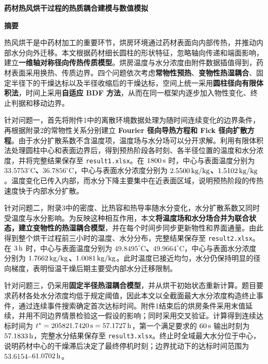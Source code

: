 \documentclass[UTF8,a4paper,12pt]{ctexart}
\begin{document}
\begin{center}
  {\fontsize{14pt}{18pt}\selectfont\bfseries 药材热风烘干过程的热质耦合建模与数值模拟}\par\vspace{10pt}
  {\fontsize{14pt}{18pt}\selectfont\bfseries 摘要}
\end{center}

热风烘干是中药材加工的重要环节，烘房环境通过药材表面向内部传热，并推动内部水分向外迁移。本文根据药材细长圆柱的形状特征，忽略轴向传递和端面影响，建立\textbf{一维轴对称径向传热传质模型}。烘房温度与水分浓度由附件数据插值得到，药材表面采用换热、传质边界。四个问题依次考虑\textbf{常物性预热}、\textbf{变物性热湿耦合}、固定半径下的干燥达标以及半径收缩后的干燥达标，空间上统一采用\textbf{圆柱径向有限体积法}，时间上采用\textbf{自适应 BDF 方法}，从而在同一框架内逐步加入物性变化、终止判据和移动边界。

针对问题一，首先将附件1中的离散环境数据处理为随时间连续变化的边界条件，再根据附录2的常物性关系分别建立\textbf{ Fourier 径向导热方程和 Fick 径向扩散方程}。由于水分扩散系数不含温度项，温度场与水分场可以分开求解。利用有限体积法处理圆柱中心和表面边界后，得到预热阶段各时刻、各半径位置的温度和水分浓度，并将完整结果保存至 \texttt{result1.xlsx}。在 $1800\rm\,s$ 时，中心与表面温度分别为 \textbf{\boldmath$33.5753^\circ\mathrm C$、$36.7856^\circ\mathrm C$}，中心与表面水分浓度分别为 \textbf{\boldmath$2.5500\rm\,kg/kg$、$1.5102\rm\,kg/kg$}。温度变化已传入内部，而水分下降主要集中在近表面区域，说明预热阶段的传热速度快于内部水分扩散。

针对问题二，附录3中的密度、比热容和热导率随水分变化，水分扩散系数又同时受温度与水分影响。为反映这种相互作用，本文\textbf{将温度场和水分场合并为联合状态，建立变物性的热湿耦合模型}，并在每个时间步同步更新物性和界面通量。由此得到整个烘干过程前三小时的温度、水分分布，完整结果保存至 \texttt{result2.xlsx}。在 $3\rm\,h$ 时，中心与表面温度分别为 \textbf{\boldmath$49.8495^\circ\mathrm C$、$49.9664^\circ\mathrm C$}，中心与表面水分浓度分别为 \textbf{\boldmath$1.7662\rm\,kg/kg$、$1.0081\rm\,kg/kg$}。此时温度已接近均匀，水分仍保持明显的径向梯度，表明恒温干燥后期主要受内部水分迁移限制。

针对问题三，仍采用\textbf{固定半径热湿耦合模型}，并从烘干初始状态重新计算。题目要求药材各处水分浓度均低于规定阈值，因此本文以全截面最大水分浓度构造终止事件，通过连续事件搜索确定首次达标时间。附件1结束后的烘房条件采用末值延续，并用不同边界情景检验这一假设的影响；同时采用交叉验证。计算得到连续达标时间为 \textbf{\boldmath$t^*=205821.7420\rm\,s=57.1727\rm\,h$}，第一个满足要求的 $60\rm\,s$ 输出时刻为 \textbf{\boldmath$57.1833\rm\,h$}，完整水分结果保存至 \texttt{result3.xlsx}。终止时全域最大水分位于中心，说明药材中心的干燥滞后决定了最终停机时刻；边界扰动下的达标时间范围为 \textbf{\boldmath$53.6154$--$61.0702\rm\,h$}。
\end{document}
